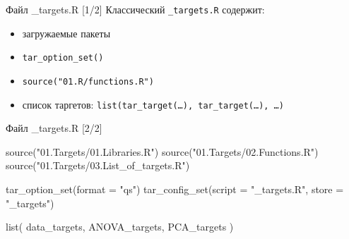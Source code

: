 \documentclass[
  ignorenonframetext,
]{beamer}
\newenvironment{Shaded}{\begin{snugshade}}{\end{snugshade}}
\newcommand{\AttributeTok}[1]{\textcolor[rgb]{0.40,0.45,0.13}{#1}}
\newcommand{\FunctionTok}[1]{\textcolor[rgb]{0.28,0.35,0.67}{#1}}
\newcommand{\NormalTok}[1]{\textcolor[rgb]{0.00,0.23,0.31}{#1}}
\newcommand{\StringTok}[1]{\textcolor[rgb]{0.13,0.47,0.30}{#1}}
\begin{document}
\begin{frame}[fragile]{Файл \_targets.R {[}1/2{]}}
\label{ux444ux430ux439ux43b-_targets.r-12}
Классический \texttt{\_targets.R} содержит:

\begin{itemize}
\item
  загружаемые пакеты
\item
  \texttt{tar\_option\_set()}
\item
  \texttt{source("01.R/functions.R")}
\item
  список таргетов: \texttt{list(tar\_target(…),\ tar\_target(…),\ …)}
\end{itemize}
\end{frame}

\begin{frame}[fragile]{Файл \_targets.R {[}2/2{]}}
\label{ux444ux430ux439ux43b-_targets.r-22}
\begin{Shaded}
\begin{Highlighting}[]
\FunctionTok{source}\NormalTok{(}\StringTok{"01.Targets/01.Libraries.R"}\NormalTok{)}
\FunctionTok{source}\NormalTok{(}\StringTok{"01.Targets/02.Functions.R"}\NormalTok{)}
\FunctionTok{source}\NormalTok{(}\StringTok{"01.Targets/03.List\_of\_targets.R"}\NormalTok{)}


\FunctionTok{tar\_option\_set}\NormalTok{(}\AttributeTok{format =} \StringTok{"qs"}\NormalTok{)}
\FunctionTok{tar\_config\_set}\NormalTok{(}\AttributeTok{script =} \StringTok{"\_targets.R"}\NormalTok{, }\AttributeTok{store =} \StringTok{"\_targets"}\NormalTok{)}


\FunctionTok{list}\NormalTok{(}
\NormalTok{  data\_targets,}
\NormalTok{  ANOVA\_targets,}
\NormalTok{  PCA\_targets}
\NormalTok{)}
\end{Highlighting}
\end{Shaded}
\end{frame}
\end{document}
